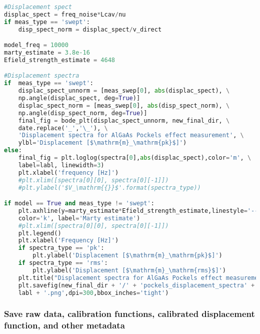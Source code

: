 \begin{lstlisting}[frame=single, language=Python]
#Displacement spect
displac_spect = freq_noise*Lcav/nu                                           # Calibrate to displacement spectra
if meas_type == 'swept':
    disp_spect_norm = displac_spect/v_direct                                 # Displacement spectra normalized by the frequency dependent injection (leaves us with mpk/Vpk)

model_freq = 10000                                                           # Model estimate
marty_estimate = 3.8e-16                                                     # mpk/[V*m]
Efield_strength_estimate = 4648                                              # [V/m] (changed from 6350 to 4648 on 07-13-2021)

#Displacement spectra
if  meas_type == 'swept':                                                    # Organizing and plotting displacement spectra
    displac_spect_unnorm = [meas_swep[0], abs(displac_spect), \
    np.angle(displac_spect, deg=True)]
    displac_spect_norm = [meas_swep[0], abs(disp_spect_norm), \
    np.angle(disp_spect_norm, deg=True)]
    final_fig = bode_plt(displac_spect_unnorm, new_final_dir, \
    date.replace('_','\_'), \
    'Displacement spectra for AlGaAs Pockels effect measurement', \
    ylbl='Displacement [$\mathrm{m}_\mathrm{pk}$]')
else:
    final_fig = plt.loglog(spectra[0],abs(displac_spect),color='m', \
    label=labl, linewidth=3)
    plt.xlabel('frequency [Hz]')
    #plt.xlim([spectra[0][0], spectra[0][-1]])
    #plt.ylabel('$V_\mathrm{{}}$'.format(spectra_type))

if model == True and meas_type != 'swept':                                   # If model estimate is requested, will plot model estimate with data
    plt.axhline(y=marty_estimate*Efield_strength_estimate,linestyle='--', \
    color='k', label='Marty estimate')
    #plt.xlim([spectra[0][0], spectra[0][-1]])
    plt.legend()
    plt.xlabel('Frequency [Hz]')
    if spectra_type == 'pk':
        plt.ylabel('Displacement [$\mathrm{m}_\mathrm{pk}$]')
    if spectra_type == 'rms':
        plt.ylabel('Displacement [$\mathrm{m}_\mathrm{rms}$]')
    plt.title("Displacement spectra for AlGaAs Pockels effect measurement")
    plt.savefig(new_final_dir + '/' + 'pockels_displacement_spectra' + \
    labl + '.png',dpi=300,bbox_inches='tight')
\end{lstlisting}

\subsubsection{Save raw data, calibration functions, calibrated
displacement function, and other
metadata}\label{save-raw-data-calibration-functions-calibrated-displacement-function-and-other-metadata}

